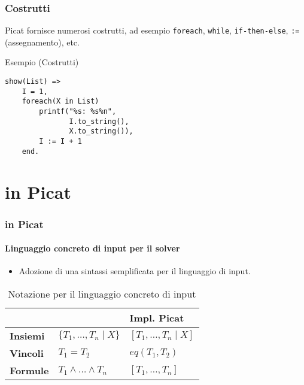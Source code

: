 \documentclass{beamer}
\begin{document}

\begin{frame}[fragile]
  \frametitle{Costrutti} Picat fornisce numerosi costrutti, ad esempio
  \texttt{foreach}, \texttt{while}, \texttt{if-then-else}, \texttt{:=}
  (assegnamento), etc.
  \begin{exampleblock}{Esempio (Costrutti)}
\begin{verbatim}
show(List) =>
    I = 1,
    foreach(X in List)
        printf("%s: %s%n", 
               I.to_string(), 
               X.to_string()),
        I := I + 1
    end.
\end{verbatim}
  \end{exampleblock}
\end{frame}


\section{\lset{} in Picat}

\begin{frame}
  \frametitle{\lset{} in Picat}
  \framesubtitle{Linguaggio concreto di input per il solver}
  \begin{itemize}
  \item Adozione di una sintassi semplificata per il linguaggio di input.
  \end{itemize}
  \begin{table}
    \begin{tabular}{l l l}
      \toprule
      & \textbf{\lset{}} & \textbf{Impl. Picat}\\
      \midrule
      \textbf{Insiemi} & $\{T_1, \ldots, T_n \mid X\}$ & $[T_1, \ldots, T_n \mid X]$ \\
      \textbf{Vincoli} & $T_1 = T_2$ & $eq(T_1, T_2)$ \\
      \textbf{Formule} & $T_1 \land \ldots \land T_n$ & $[T_1, \ldots, T_n]$ \\
      \bottomrule
    \end{tabular}
    \caption{Notazione per il linguaggio concreto di input}
  \end{table}
\end{frame}

\end{document}
